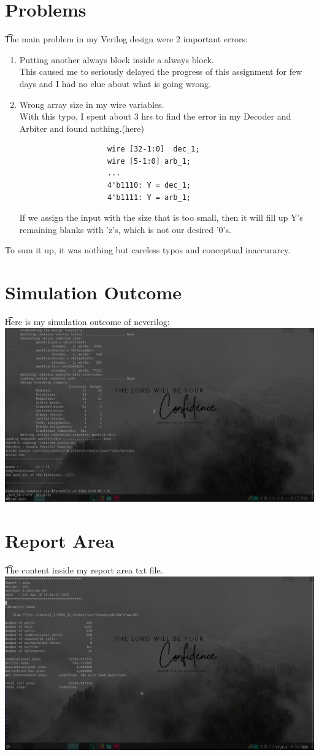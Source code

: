 \documentclass{article}
\begin{document}
	\section{Problems}
		\t The main problem in my Verilog design were 2 important errors:
		\begin{enumerate}
			\item{Putting another always block inside a always block.\\ This caused me to seriously delayed the progress of this assignment for few days and I had no clue about what is going wrong.}
			\item{Wrong array size in my wire variables.\\ With this typo, I spent about 3 hrs to find the error in my Decoder and Arbiter and found nothing.(here)
				\begin{verbatim}
					wire [32-1:0]  dec_1;
					wire [5-1:0] arb_1;
					...
					4'b1110: Y = dec_1; 
					4'b1111: Y = arb_1;
				\end{verbatim}
				If we assign the input with the size that is too small, then it will fill up Y's remaining blanks with 'z's, which is not our desired '0's.}

		\end{enumerate}
		To sum it up, it was nothing but careless typos and conceptual inaccurarcy.

	\section{Simulation Outcome}
		\t Here is my simulation outcome of ncverilog:\\
		\includegraphics[width = 16cm]{sim_outcome.png}
	\section{Report Area}
		\t The content inside my report area txt file.\\
		\includegraphics[width = 16cm]{report_area1.png}
\end{document}
